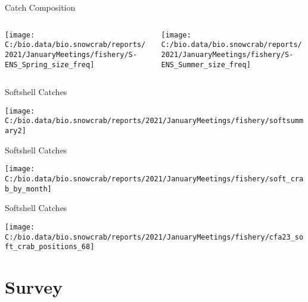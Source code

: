 \documentclass[
  ignorenonframetext,
]{beamer}
\begin{document}
\begin{frame}{Catch Composition}
\protect\hypertarget{catch-composition-1}{}
\begin{columns}[T]
\begin{column}{0.48\textwidth}
\begin{center}\texttt{[image: C:/bio.data/bio.snowcrab/reports/2021/JanuaryMeetings/fishery/S-ENS\_Spring\_size\_freq]} \end{center}
\end{column}

\begin{column}{0.48\textwidth}
\begin{center}\texttt{[image: C:/bio.data/bio.snowcrab/reports/2021/JanuaryMeetings/fishery/S-ENS\_Summer\_size\_freq]} \end{center}
\end{column}
\end{columns}
\end{frame}

\begin{frame}{Softshell Catches}
\protect\hypertarget{softshell-catches}{}
\begin{center}\texttt{[image: C:/bio.data/bio.snowcrab/reports/2021/JanuaryMeetings/fishery/softsummary2]} \end{center}
\end{frame}

\begin{frame}{Softshell Catches}
\protect\hypertarget{softshell-catches-1}{}
\begin{center}\texttt{[image: C:/bio.data/bio.snowcrab/reports/2021/JanuaryMeetings/fishery/soft\_crab\_by\_month]} \end{center}
\end{frame}

\begin{frame}{Softshell Catches}
\protect\hypertarget{softshell-catches-2}{}
\begin{center}\texttt{[image: C:/bio.data/bio.snowcrab/reports/2021/JanuaryMeetings/fishery/cfa23\_soft\_crab\_positions\_68]} \end{center}
\end{frame}

\hypertarget{survey}{%
\section{Survey}\label{survey}}
\end{document}

